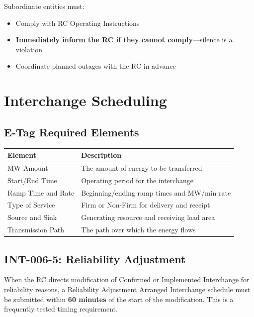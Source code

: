 \documentclass[12pt,twoside,openright]{memoir}
\begin{document}
Subordinate entities must:
\begin{itemize}
  \item Comply with RC Operating Instructions
  \item \textbf{Immediately inform the RC if they cannot comply}—silence is a violation
  \item Coordinate planned outages with the RC in advance
\end{itemize}

\chapter{Interchange Scheduling}
\label{ch:interchange}

\section{E-Tag Required Elements}

\begin{center}
\begin{tabular}{@{}lp{9cm}@{}}
\toprule
\rowcolor{nercblue!15}
\textbf{Element} & \textbf{Description} \\
\midrule
MW Amount & The amount of energy to be transferred \\
\rowcolor{rowlight}
Start/End Time & Operating period for the interchange \\
Ramp Time and Rate & Beginning/ending ramp times and MW/min rate \\
\rowcolor{rowlight}
Type of Service & Firm or Non-Firm for delivery and receipt \\
Source and Sink & Generating resource and receiving load area \\
\rowcolor{rowlight}
Transmission Path & The path over which the energy flows \\
\bottomrule
\end{tabular}
\end{center}

\section{INT-006-5: Reliability Adjustment}

\begin{examtip}
When the RC directs modification of Confirmed or Implemented Interchange for
reliability reasons, a Reliability Adjustment Arranged Interchange schedule must
be submitted within \textbf{60 minutes} of the start of the modification.
This is a frequently tested timing requirement.
\end{examtip}
\end{document}

